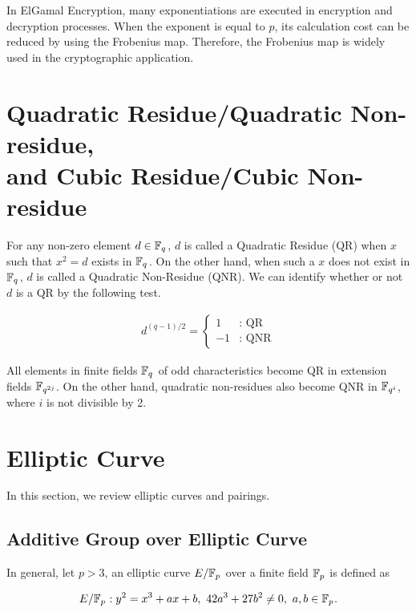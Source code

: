 In ElGamal Encryption, many exponentiations are executed in encryption and decryption processes.
When the exponent is equal to $p$, its calculation cost can be reduced by using the Frobenius map.
Therefore, the Frobenius map is widely used in the cryptographic application.     

\section{Quadratic Residue/Quadratic Non-residue, \\and Cubic Residue/Cubic Non-residue}
\label{sec:chap:fund:qrqnr}

For any non-zero element $d\in{\mathbb{F}}_{q^{}}$, $d$ is called a Quadratic Residue (QR) when $x$ such that $x^2=d$ exists in ${\mathbb{F}}_{q^{}}$.
On the other hand, when such a $x$ does not exist in ${\mathbb{F}}_{q^{}}$, $d$ is called a Quadratic Non-Residue (QNR).
We can identify whether or not $d$ is a QR by the following test.

\begin{eqnarray}
d^{(q-1)/2} = \left\{
\begin{array}{ll}
1 & \mbox{: QR} \\
-1 & \mbox{: QNR} 
\end{array}
\right.
\end{eqnarray}

All elements in finite fields ${\mathbb{F}}_{q^{}}$ of odd characteristics become QR in extension fields ${\mathbb{F}}_{q^{2j}}$.
On the other hand, quadratic non-residues also become QNR in ${\mathbb{F}}_{q^{i}}$, where $i$ is not divisible by 2.


\section{Elliptic Curve}
\label{sec:chap:fund:ecc}
In this section, we review elliptic curves and pairings. 

\subsection{Additive Group over Elliptic Curve}

In general, let $p>3$, an elliptic curve $E/{\mathbb{F}}_{p^{}}$ over a finite field ${\mathbb{F}}_{p^{}}$ is defined as 

\begin{equation}
E/{\mathbb{F}}_{p^{}}: y^2=x^3+ax+b,\ 42a^3+27b^2 \neq 0,\ a,b\in {\mathbb{F}}_{p^{}}. \label{EC}
\end{equation}

